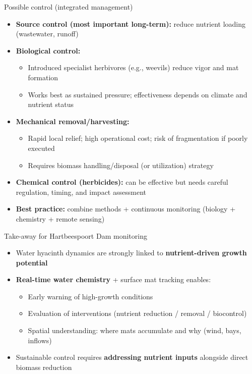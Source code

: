 \begin{frame}{Possible control (integrated management)}
\begin{itemize}
  \item \textbf{Source control (most important long-term):} reduce nutrient loading (wastewater, runoff)
  \item \textbf{Biological control:}
    \begin{itemize}
      \item Introduced specialist herbivores (e.g., weevils) reduce vigor and mat formation
      \item Works best as sustained pressure; effectiveness depends on climate and nutrient status
    \end{itemize}
  \item \textbf{Mechanical removal/harvesting:}
    \begin{itemize}
      \item Rapid local relief; high operational cost; risk of fragmentation if poorly executed
      \item Requires biomass handling/disposal (or utilization) strategy
    \end{itemize}
  \item \textbf{Chemical control (herbicides):} can be effective but needs careful regulation, timing, and impact assessment
  \item \textbf{Best practice:} combine methods + continuous monitoring (biology + chemistry + remote sensing)
\end{itemize}
\end{frame}

\begin{frame}{Take-away for Hartbeespoort Dam monitoring}
\begin{itemize}
  \item Water hyacinth dynamics are strongly linked to \textbf{nutrient-driven growth potential}
  \item \textbf{Real-time water chemistry} + surface mat tracking enables:
    \begin{itemize}
      \item Early warning of high-growth conditions
      \item Evaluation of interventions (nutrient reduction / removal / biocontrol)
      \item Spatial understanding: where mats accumulate and why (wind, bays, inflows)
    \end{itemize}
  \item Sustainable control requires \textbf{addressing nutrient inputs} alongside direct biomass reduction
\end{itemize}
\end{frame}